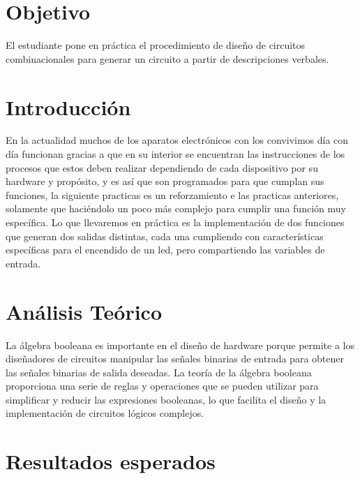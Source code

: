 \documentclass{article}
\begin{document}
\begin{abstract}
	\begin{justify}
		Se diseño la aplicación de 3 entradas (w,x,y) y dos salidas: F(x) = verdadero cuando es menor que 5 e impar $\&$ G(x) = verdadero cuando es par y mayor que 5.	
		\end{justify}
{\it Keywords:}   diseño de hardware, álgebra booleana 
\end{abstract}
\begin{multicols}{2}
\section{Objetivo}\label{Objetivo}
El estudiante pone en práctica el procedimiento de diseño de circuitos combinacionales para generar un circuito a partir de descripciones verbales.
\section{Introducción}\label{sec:intro}
En la actualidad muchos de los aparatos electrónicos con los convivimos día con día funcionan gracias a que en su interior se encuentran las instrucciones de los procesos que estos deben realizar dependiendo de cada dispositivo por su hardware y propósito, y es así que son programados para que cumplan sus funciones, la siguiente practicas es un reforzamiento e las practicas anteriores, solamente que haciéndolo un poco más complejo para cumplir una función muy específica. Lo que llevaremos en práctica es la implementación de dos funciones que generan dos salidas distintas, cada una cumpliendo con características específicas para el encendido de un led, pero compartiendo las variables de entrada. 
\section{Análisis Teórico}\label{sec:analiTeorico}
La álgebra booleana es importante en el diseño de hardware porque permite a los diseñadores de circuitos manipular las señales binarias de entrada para obtener las señales binarias de salida deseadas. La teoría de la álgebra booleana proporciona una serie de reglas y operaciones que se pueden utilizar para simplificar y reducir las expresiones booleanas, lo que facilita el diseño y la implementación de circuitos lógicos complejos.
\section{Resultados esperados}\label{sec:resEsperados}


\end{multicols}
\end{document}
